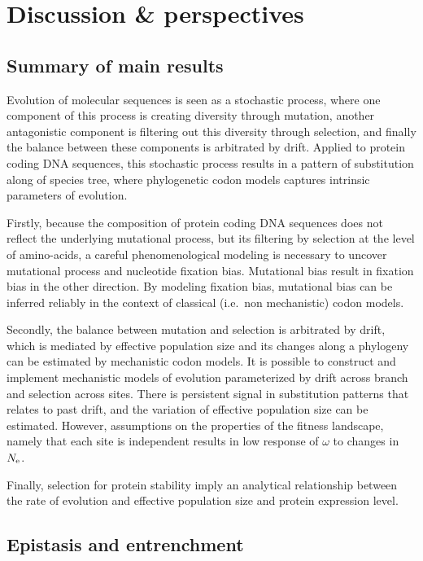 \chapter{Discussion \& perspectives}
{\hypersetup{linkcolor=GREYDARK}\minitoc}

\section{Summary of main results}

Evolution of molecular sequences is seen as a stochastic process, where one component of this process is creating diversity through mutation, another antagonistic component is filtering out this diversity through selection, and finally the balance between these components is arbitrated by drift.
Applied to protein coding DNA sequences, this stochastic process results in a pattern of substitution along of species tree, where phylogenetic codon models captures intrinsic parameters of evolution.

Firstly, because the composition of protein coding DNA sequences does not reflect the underlying mutational process, but its filtering by selection at the level of amino-acids, a careful phenomenological modeling is necessary to uncover mutational process and nucleotide fixation bias.
Mutational bias result in fixation bias in the other direction.
By modeling fixation bias, mutational bias can be inferred reliably in the context of classical (i.e.\ non mechanistic) codon models.

Secondly, the balance between mutation and selection is arbitrated by drift, which is mediated by effective population size and its changes along a phylogeny can be estimated by mechanistic codon models.
It is possible to construct and implement mechanistic models of evolution parameterized by drift across branch and selection across sites.
There is persistent signal in substitution patterns that relates to past drift, and the variation of effective population size can be estimated.
However, assumptions on the properties of the fitness landscape, namely that each site is independent results in low response of $\omega$ to changes in $N_{\textrm{e}}$.

Finally, selection for protein stability imply an analytical relationship between the rate of evolution and effective population size and protein expression level.


\section{Epistasis and entrenchment}

